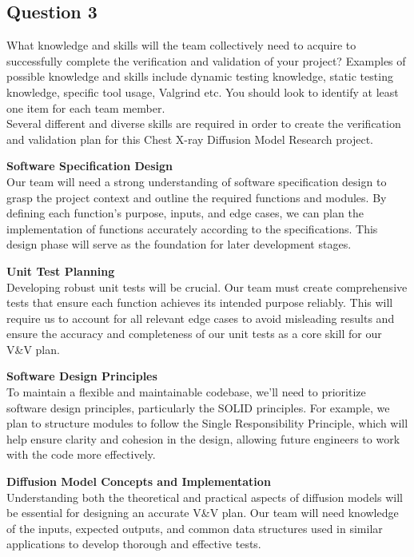 \documentclass[12pt, titlepage]{article}
\begin{document}
\subsection{Question 3}
What knowledge and skills will the team collectively need to acquire to
successfully complete the verification and validation of your project?
Examples of possible knowledge and skills include dynamic testing knowledge,
static testing knowledge, specific tool usage, Valgrind etc.  You should look to
identify at least one item for each team member.\\

Several different and diverse skills are required in order to create the verification and validation plan for this Chest X-ray Diffusion Model Research project.

\textbf{Software Specification Design}\\
Our team will need a strong understanding of software specification design to grasp the project context and outline the required functions and modules. By defining each function’s purpose, inputs, and edge cases, we can plan the implementation of functions accurately according to the specifications. This design phase will serve as the foundation for later development stages.

\textbf{Unit Test Planning}\\
Developing robust unit tests will be crucial. Our team must create comprehensive tests that ensure each function achieves its intended purpose reliably. This will require us to account for all relevant edge cases to avoid misleading results and ensure the accuracy and completeness of our unit tests as a core skill for our V\&V plan.

\textbf{Software Design Principles}\\
To maintain a flexible and maintainable codebase, we’ll need to prioritize software design principles, particularly the SOLID principles. For example, we plan to structure modules to follow the Single Responsibility Principle, which will help ensure clarity and cohesion in the design, allowing future engineers to work with the code more effectively.

\textbf{Diffusion Model Concepts and Implementation}\\
Understanding both the theoretical and practical aspects of diffusion models will be essential for designing an accurate V\&V plan. Our team will need knowledge of the inputs, expected outputs, and common data structures used in similar applications to develop thorough and effective tests.
\end{document}
